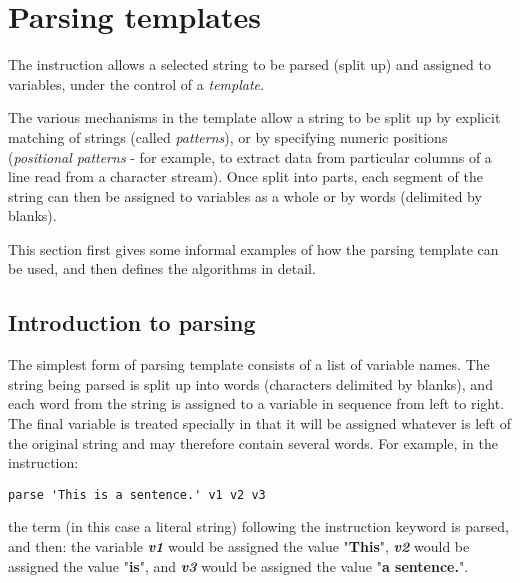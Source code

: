 \chapter{Parsing templates}\label{refparsing}
 The  instruction allows a selected string to
be parsed (split up) and assigned to variables, under the control of a
\emph{template}.
 
The various mechanisms in the template allow a string to be split up by
explicit matching of strings (called \emph{patterns}), or by
specifying numeric positions (\emph{positional patterns} - for
example, to extract data from particular columns of a line read from a
character stream).
Once split into parts, each segment of the string can then be assigned
to variables as a whole or by words (delimited by blanks).
 
This section first gives some informal examples of how the parsing
template can be used, and then defines the algorithms in detail.
\section{Introduction to parsing}\label{parseintro}
 The simplest form of parsing template consists of a list of variable
names.
The string being parsed is split up into words (characters delimited by
blanks), and each word from the string is assigned to a
variable in sequence from left to right.
The final variable is treated specially in that it will be assigned
whatever is left of the original string and may therefore contain
several words.
For example, in the  instruction:
\begin{lstlisting}
parse 'This is a sentence.' v1 v2 v3
\end{lstlisting}
the term (in this case a literal string) following the instruction
keyword is parsed, and then:  the variable \textbf{\emph{v1}}
would be assigned the value "\textbf{This}", \textbf{\emph{v2}}
would be assigned the value "\textbf{is}",
and \textbf{\emph{v3}} would be assigned the
value "\textbf{a sentence.}".
 
